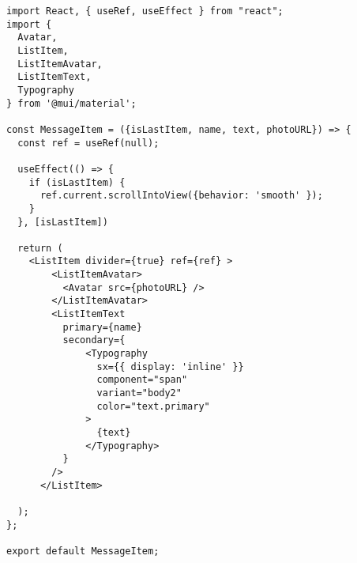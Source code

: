 \begin{verbatim}
import React, { useRef, useEffect } from "react";
import { 
  Avatar,
  ListItem,
  ListItemAvatar,
  ListItemText,
  Typography
} from '@mui/material';

const MessageItem = ({isLastItem, name, text, photoURL}) => {
  const ref = useRef(null);

  useEffect(() => {
    if (isLastItem) {
      ref.current.scrollIntoView({behavior: 'smooth' });
    }
  }, [isLastItem])

  return (  
    <ListItem divider={true} ref={ref} >
        <ListItemAvatar>
          <Avatar src={photoURL} />
        </ListItemAvatar>
        <ListItemText
          primary={name}
          secondary={
              <Typography
                sx={{ display: 'inline' }}
                component="span"
                variant="body2"
                color="text.primary"
              >
                {text}
              </Typography>
          }
        />
      </ListItem>

  );
};

export default MessageItem;


\end{verbatim}